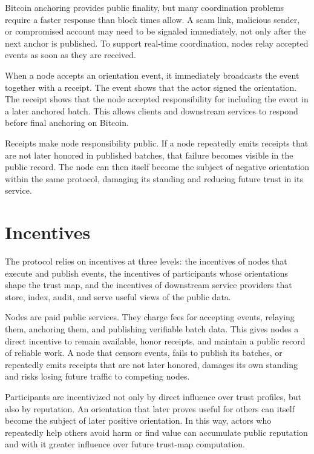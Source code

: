 \documentclass[11pt]{article}
\begin{document}
Bitcoin anchoring provides public finality, but many coordination problems require a faster response than block times allow. A scam link, malicious sender, or compromised account may need to be signaled immediately, not only after the next anchor is published. To support real-time coordination, nodes relay accepted events as soon as they are received.

When a node accepts an orientation event, it immediately broadcasts the event together with a receipt. The event shows that the actor signed the orientation. The receipt shows that the node accepted responsibility for including the event in a later anchored batch. This allows clients and downstream services to respond before final anchoring on Bitcoin.

Receipts make node responsibility public. If a node repeatedly emits receipts that are not later honored in published batches, that failure becomes visible in the public record. The node can then itself become the subject of negative orientation within the same protocol, damaging its standing and reducing future trust in its service.

\section{Incentives}

The protocol relies on incentives at three levels: the incentives of nodes that execute and publish events, the incentives of participants whose orientations shape the trust map, and the incentives of downstream service providers that store, index, audit, and serve useful views of the public data.

Nodes are paid public services. They charge fees for accepting events, relaying them, anchoring them, and publishing verifiable batch data. This gives nodes a direct incentive to remain available, honor receipts, and maintain a public record of reliable work. A node that censors events, fails to publish its batches, or repeatedly emits receipts that are not later honored, damages its own standing and risks losing future traffic to competing nodes.

Participants are incentivized not only by direct influence over trust profiles, but also by reputation. An orientation that later proves useful for others can itself become the subject of later positive orientation. In this way, actors who repeatedly help others avoid harm or find value can accumulate public reputation and with it greater influence over future trust-map computation.
\end{document}
